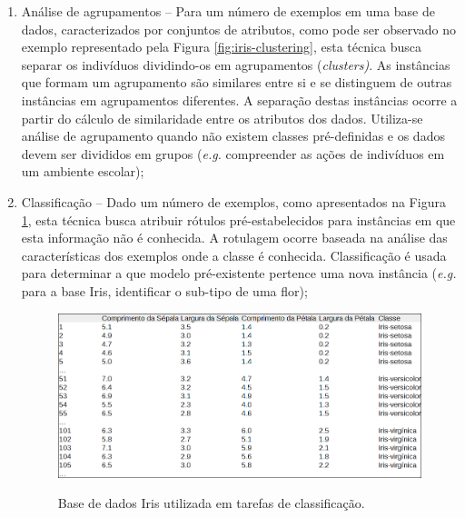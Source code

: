 \begin{enumerate}[label=\roman*.]
    \item Análise de agrupamentos {--} Para um número de exemplos em uma base de dados, caracterizados por conjuntos de atributos, como pode ser observado no exemplo representado pela Figura \ref{fig:iris-clustering}, esta técnica busca separar os indivíduos dividindo\hyp{}os em agrupamentos (\textit{clusters)}. As instâncias que formam um agrupamento são similares entre si e se distinguem de outras instâncias em agrupamentos diferentes. A separação destas instâncias ocorre a partir do cálculo de similaridade entre os atributos dos dados. Utiliza\hyp{}se análise de agrupamento quando não existem classes pré\hyp{}definidas e os dados devem ser divididos em grupos (\textit{e.g.} compreender as ações de indivíduos em um ambiente escolar);
    \item Classificação {--} Dado um número de exemplos, como apresentados na Figura \ref{fig:iris-classification}, esta técnica busca atribuir rótulos pré\hyp{}estabelecidos para instâncias em que esta informação não é conhecida. A rotulagem ocorre baseada na análise das características dos exemplos onde a classe é conhecida. Classificação é usada para determinar a que modelo pré\hyp{}existente pertence uma nova instância (\textit{e.g.} para a base Iris, identificar o sub-tipo de uma flor);
    
    \begin{figure}[H]
        \centering
        \caption{Base de dados Iris utilizada em tarefas de classificação.}
        \includegraphics[width=0.9\linewidth]{figuras/iris-classification.png}
        \label{fig:iris-classification}
    \end{figure}
    

\end{enumerate}
